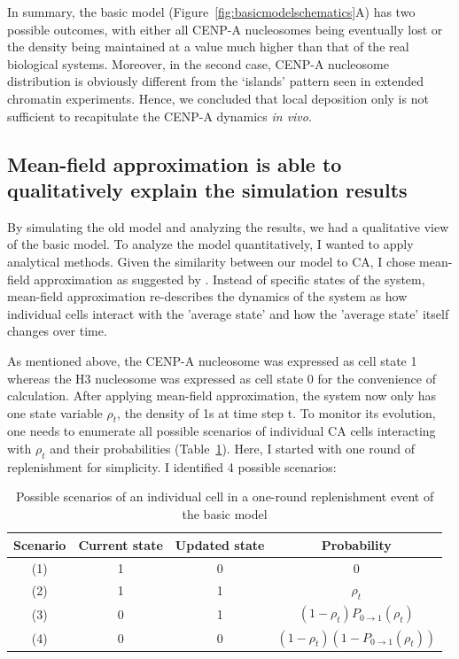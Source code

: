 In summary, the basic model (Figure~\ref{fig:basicmodelschematics}A) has two possible outcomes, with either all CENP-A nucleosomes being eventually lost or the density being maintained at a value much higher than that of the real biological systems. Moreover, in the second case, CENP-A nucleosome distribution is obviously different from the ‘islands’ pattern seen in extended chromatin experiments. Hence, we concluded that local deposition only is not sufficient to recapitulate the CENP-A dynamics \textit{in vivo}.


\subsection{Mean-field approximation is able to qualitatively explain the simulation results}

By simulating the old model and analyzing the results, we had a qualitative view of the basic model. To analyze the model
quantitatively, I wanted to apply analytical methods. Given the similarity between our model to CA, I chose mean-field
approximation as suggested by \citep{Sayama2013IntroductionSystems}. Instead of specific states of the system, mean-field approximation re-describes the dynamics of the system as how individual cells interact with the ’average state’ and how the ’average state’ itself changes over time. 

As mentioned above, the CENP-A nucleosome was expressed as cell state 1 whereas the H3 nucleosome was expressed as cell state 0 for the convenience of calculation. After applying mean-field approximation, the system now only has one state variable $\rho_{t}$, the density of 1s at time step t. To monitor its evolution, one needs to enumerate all possible scenarios of individual CA cells interacting with $\rho_{t}$ and their probabilities (Table~\ref{tab:MFAscenariosBasic}). Here, I started with one round of replenishment for simplicity. I identified 4 possible scenarios:

\begin{table}[htbp]
\centering
\caption{Possible scenarios of an individual cell in a one-round replenishment event of the basic model}
\label{tab:MFAscenariosBasic}
\begin{tabular}{cccc}
\hline
\textbf{Scenario} & \textbf{Current state} & \textbf{Updated state} & \textbf{Probability} \\ \hline
(1) & 1                        & 0                      & 0                    \\
(2) & 1                        & 1                      & $\rho_{t}$                    \\
(3) & 0                        & 1                      & $(1 - \rho_{t})P_{0\rightarrow 1}(\rho_{t})$     \\
(4) & 0                        & 0                      & $(1 - \rho_{t})(1 - P_{0\rightarrow 1}(\rho_{t}))$ \\ \hline
\end{tabular}
\end{table}


